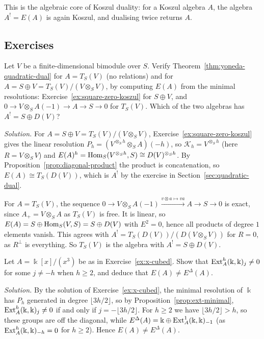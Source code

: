 This is the algebraic core of Koszul duality: for a Koszul algebra $A$, the algebra $A^!=E(A)$ is again Koszul, and dualising twice returns $A$.

\subsection{Exercises}

\begin{exercise}
Let $V$ be a finite-dimensional bimodule over $S$.
Verify Theorem~\ref{thm:yoneda-quadratic-dual} for $A=T_S(V)$ (no relations) and for $A=S\oplus V=T_S(V)/(V\otimes_SV)$, by computing $E(A)$ from the minimal resolutions: Exercise~\ref{ex:square-zero-koszul} for $S\oplus V$, and $0\to V\otimes_SA(-1)\to A\to S\to0$ for $T_S(V)$.
Which of the two algebras has $A^!=S\oplus D(V)$?
\end{exercise}

\begin{hidden}
\emph{Solution.}
For $A=S\oplus V=T_S(V)/(V\otimes_SV)$, Exercise~\ref{ex:square-zero-koszul} gives the linear resolution $P_h=(V^{\otimes_Sh}\otimes_SA)(-h)$, so $\mathcal K_h=V^{\otimes_Sh}$ (here $R=V\otimes_SV$) and $E(A)^h=\operatorname{Hom}\nolimits_S(V^{\otimes_Sh},S)\cong D(V)^{\otimes_Sh}$.
By Proposition~\ref{prop:diagonal-product} the product is concatenation, so $E(A)\cong T_S(D(V))$, which is $A^!$ by the exercise in Section~\ref{sec:quadratic-dual}.

For $A=T_S(V)$, the sequence $0\to V\otimes_SA(-1)\xrightarrow{v\otimes a\mapsto va}A\to S\to0$ is exact, since $A_+=V\otimes_SA$ as $T_S(V)$ is free.
It is linear, so $E(A)=S\oplus\operatorname{Hom}\nolimits_S(V,S)=S\oplus D(V)$ with $E^2=0$, hence all products of degree $1$ elements vanish.
This agrees with $A^!=T_S(D(V))/(D(V\otimes_SV))$ for $R=0$, as $R^\perp$ is everything.
So $T_S(V)$ is the algebra with $A^!=S\oplus D(V)$.
\end{hidden}


\begin{exercise}
Let $A=\Bbbk[x]/(x^3)$ be as in Exercise~\ref{ex:x-cubed}.
Show that $\operatorname{Ext}\nolimits_A^h(\Bbbk,\Bbbk)_j\neq0$ for some $j\neq-h$ when $h\geq2$, and deduce that $E(A)\neq E^\Delta(A)$.
\end{exercise}

\begin{hidden}
\emph{Solution.}
By the solution of Exercise~\ref{ex:x-cubed}, the minimal resolution of $\Bbbk$ has $P_h$ generated in degree $\lfloor3h/2\rfloor$, so by Proposition~\ref{prop:ext-minimal}, $\operatorname{Ext}\nolimits_A^h(\Bbbk,\Bbbk)_j\neq0$ if and only if $j=-\lfloor3h/2\rfloor$.
For $h\geq2$ we have $\lfloor3h/2\rfloor>h$, so these groups are off the diagonal, while $E^\Delta(A)=\Bbbk\oplus\operatorname{Ext}\nolimits^1_A(\Bbbk,\Bbbk)_{-1}$ (as $\operatorname{Ext}\nolimits^h_A(\Bbbk,\Bbbk)_{-h}=0$ for $h\geq2$).
Hence $E(A)\neq E^\Delta(A)$.
\end{hidden}


